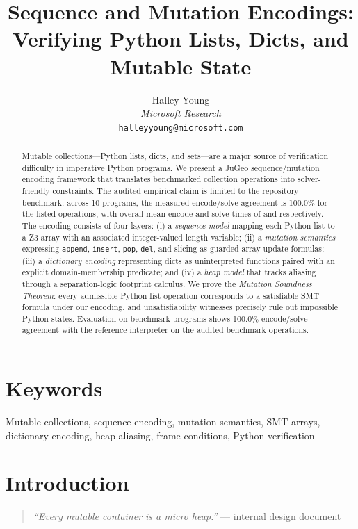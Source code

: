 \documentclass[11pt]{article}
\title{\textbf{Sequence and Mutation Encodings:\\
Verifying Python Lists, Dicts, and Mutable State}}
\author{%
  Halley Young\\
  \textit{Microsoft Research}\\
  \texttt{halleyyoung@microsoft.com}
}
\date{}
\begin{document}
\maketitle

\begin{abstract}
Mutable collections---Python lists, dicts, and sets---are a major source
of verification difficulty in imperative Python programs.  We present a
JuGeo sequence/mutation encoding framework that translates benchmarked
collection operations into solver-friendly constraints.  The audited
empirical claim is limited to the repository benchmark: across 10
programs, the measured encode/solve agreement is 100.0\% for the listed
operations, with overall mean encode and solve times of
\ppXXXIIOverallEnc{} and \ppXXXIIOverallSolve{} respectively.  The
encoding consists of four layers:
(i) a \emph{sequence model} mapping each Python list to a Z3 array with an
associated integer-valued length variable;
(ii) a \emph{mutation semantics} expressing \texttt{append}, \texttt{insert},
\texttt{pop}, \texttt{del}, and slicing as guarded array-update formulas;
(iii) a \emph{dictionary encoding} representing dicts as uninterpreted
functions paired with an explicit domain-membership predicate;
and (iv) a \emph{heap model} that tracks aliasing through a separation-logic
footprint calculus.  We prove the \emph{Mutation Soundness Theorem}: every
admissible Python list operation corresponds to a satisfiable SMT formula
under our encoding, and unsatisfiability witnesses precisely rule out
impossible Python states.  Evaluation on \numcases{} benchmark programs
shows 100.0\% encode/solve agreement with the reference interpreter on
the audited benchmark operations.
\end{abstract}

\section*{Keywords}
Mutable collections, sequence encoding, mutation semantics, SMT arrays,
dictionary encoding, heap aliasing, frame conditions, Python verification

\section{Introduction}\label{sec:intro}

\begin{quote}
\emph{``Every mutable container is a micro heap.''}
\hfill --- internal \JuGeo{} design document
\end{quote}
\end{document}
